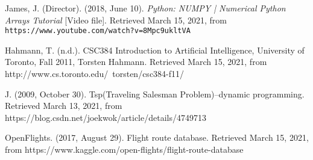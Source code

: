 \documentclass[fontsize=11pt]{article}
\begin{document}
\begin{thebibliography}{9}
James, J. (Director). (2018, June 10). 
\textit{Python: NUMPY | Numerical Python Arrays Tutorial} [Video file]. Retrieved March 15, 2021, from 
\texttt{https://www.youtube.com/watch?v=8Mpc9ukltVA}

Hahmann, T. (n.d.). CSC384 Introduction to Artificial Intelligence, University of Toronto, Fall 2011, Torsten Hahmann. Retrieved March 15, 2021, from http://www.cs.toronto.edu/~torsten/csc384-f11/

J. (2009, October 30). Tsp(Traveling Salesman Problem)--dynamic programming. Retrieved March 13, 2021, from https://blog.csdn.net/joekwok/article/details/4749713

OpenFlights. (2017, August 29). Flight route database. Retrieved March 15, 2021, from https://www.kaggle.com/open-flights/flight-route-database
\end{thebibliography}
\end{document}
